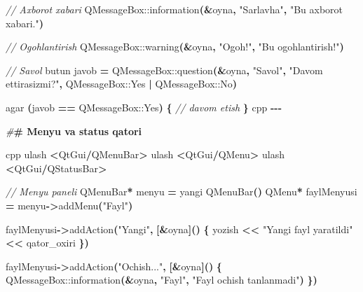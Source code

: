 \documentclass[a4paper,11pt,twoside,openright]{book}
\newenvironment{Shaded}{\begin{snugshade}}{\end{snugshade}}
\newcommand{\CommentTok}[1]{\textcolor[rgb]{0.56,0.35,0.01}{\textit{#1}}}
\newcommand{\ErrorTok}[1]{\textcolor[rgb]{0.64,0.00,0.00}{\textbf{#1}}}
\newcommand{\ExtensionTok}[1]{#1}
\newcommand{\NormalTok}[1]{#1}
\newcommand{\OperatorTok}[1]{\textcolor[rgb]{0.81,0.36,0.00}{\textbf{#1}}}
\newcommand{\PreprocessorTok}[1]{\textcolor[rgb]{0.56,0.35,0.01}{\textit{#1}}}
\newcommand{\StringTok}[1]{\textcolor[rgb]{0.31,0.60,0.02}{#1}}
\begin{document}
\begin{Shaded}
\begin{Highlighting}[]
\CommentTok{// Axborot xabari}
\ExtensionTok{QMessageBox::information}\OperatorTok{(\&}\NormalTok{oyna}\OperatorTok{,} \StringTok{"Sarlavha"}\OperatorTok{,} \StringTok{"Bu axborot xabari."}\OperatorTok{)}

\CommentTok{// Ogohlantirish}
\ExtensionTok{QMessageBox::warning}\OperatorTok{(\&}\NormalTok{oyna}\OperatorTok{,} \StringTok{"Ogoh!"}\OperatorTok{,} \StringTok{"Bu ogohlantirish!"}\OperatorTok{)}

\CommentTok{// Savol}
\NormalTok{butun javob }\OperatorTok{=} \ExtensionTok{QMessageBox::question}\OperatorTok{(\&}\NormalTok{oyna}\OperatorTok{,} \StringTok{"Savol"}\OperatorTok{,} \StringTok{"Davom ettirasizmi?"}\OperatorTok{,}
    \ExtensionTok{QMessageBox::Yes} \OperatorTok{|} \ExtensionTok{QMessageBox::No}\OperatorTok{)}

\NormalTok{agar }\OperatorTok{(}\NormalTok{javob }\OperatorTok{==} \ExtensionTok{QMessageBox::Yes}\OperatorTok{)} \OperatorTok{\{}
    \CommentTok{// davom etish}
\OperatorTok{\}}
\ErrorTok{\textasciigrave{}\textasciigrave{}\textasciigrave{}}\NormalTok{cpp}
\OperatorTok{{-}{-}{-}}

\PreprocessorTok{\#}\ErrorTok{\# Menyu va status qatori}

\ErrorTok{\textasciigrave{}\textasciigrave{}\textasciigrave{}}\NormalTok{cpp}
\NormalTok{ulash }\OperatorTok{\textless{}}\NormalTok{QtGui}\OperatorTok{/}\ExtensionTok{QMenuBar}\OperatorTok{\textgreater{}}
\NormalTok{ulash }\OperatorTok{\textless{}}\NormalTok{QtGui}\OperatorTok{/}\ExtensionTok{QMenu}\OperatorTok{\textgreater{}}
\NormalTok{ulash }\OperatorTok{\textless{}}\NormalTok{QtGui}\OperatorTok{/}\ExtensionTok{QStatusBar}\OperatorTok{\textgreater{}}

\CommentTok{// Menyu paneli}
\ExtensionTok{QMenuBar}\OperatorTok{*}\NormalTok{ menyu }\OperatorTok{=}\NormalTok{ yangi }\ExtensionTok{QMenuBar}\OperatorTok{()}
\ExtensionTok{QMenu}\OperatorTok{*}\NormalTok{ faylMenyusi }\OperatorTok{=}\NormalTok{ menyu}\OperatorTok{{-}\textgreater{}}\NormalTok{addMenu}\OperatorTok{(}\StringTok{"Fayl"}\OperatorTok{)}

\NormalTok{faylMenyusi}\OperatorTok{{-}\textgreater{}}\NormalTok{addAction}\OperatorTok{(}\StringTok{"Yangi"}\OperatorTok{,} \OperatorTok{[\&}\NormalTok{oyna}\OperatorTok{]()} \OperatorTok{\{}
\NormalTok{    yozish }\OperatorTok{\textless{}\textless{}} \StringTok{"Yangi fayl yaratildi"} \OperatorTok{\textless{}\textless{}}\NormalTok{ qator\_oxiri}
\OperatorTok{\})}

\NormalTok{faylMenyusi}\OperatorTok{{-}\textgreater{}}\NormalTok{addAction}\OperatorTok{(}\StringTok{"Ochish..."}\OperatorTok{,} \OperatorTok{[\&}\NormalTok{oyna}\OperatorTok{]()} \OperatorTok{\{}
    \ExtensionTok{QMessageBox::information}\OperatorTok{(\&}\NormalTok{oyna}\OperatorTok{,} \StringTok{"Fayl"}\OperatorTok{,} \StringTok{"Fayl ochish tanlanmadi"}\OperatorTok{)}
\OperatorTok{\})}


\end{Highlighting}
\end{Shaded}
\end{document}
